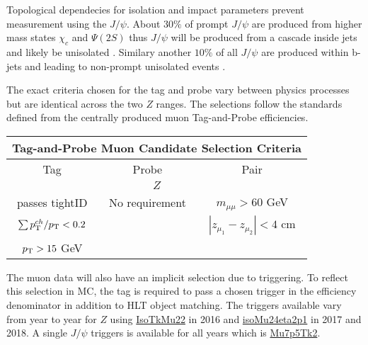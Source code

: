 Topological dependecies for isolation and impact parameters prevent measurement using the $J/\psi$. About $30\%$ of prompt $J/\psi$ are produced from higher mass states $\chi_c$ and $\Psi(2S)$ thus $J/\psi$ will be produced from a cascade inside jets and likely be unisolated \cite{Lansberg:2006dh}. Similary another $10\%$ of all $J/\psi$ are produced within b-jets and leading to  non-prompt  unisolated events \cite{LHCb:2013itw}.

The exact criteria chosen for the tag and probe vary between physics processes but are identical across the two $Z$ ranges. The selections follow the standards defined from the centrally produced muon Tag-and-Probe efficiencies.\\

\begin{table}
\small
\begin{tabular}{|c|c|c|}
\hline 
\multicolumn{3}{|c|}{Tag-and-Probe Muon Candidate Selection Criteria} \\ 
\hline 
\hline
Tag & Probe & Pair \\ 
\hline 
\multicolumn{3}{|c|}{$Z$} \\
\hline
passes tightID & No requirement & $m_{\mu\mu} > 60$ GeV \\
$\sum p_{\mathrm{T}}^{ch} / p_{\mathrm{T}} < 0.2$ & &  $|z_{\mu_1} - z_{\mu_2}| <4 $ cm \\
$p_{\mathrm{T}} > 15$ GeV &   &   \\
\hline 
\end{tabular} 
\end{table}
The muon data will also  have an implicit selection due to triggering. To reflect this selection in MC, the tag is required to pass a chosen trigger in the efficiency denominator in addition to HLT object matching. The triggers available vary from year to year for $Z$ using \url{IsoTkMu22} in 2016 and \url{isoMu24eta2p1} in 2017 and 2018. A single $J/\psi$ triggers is available for all years which is \url{Mu7p5Tk2}.\\

